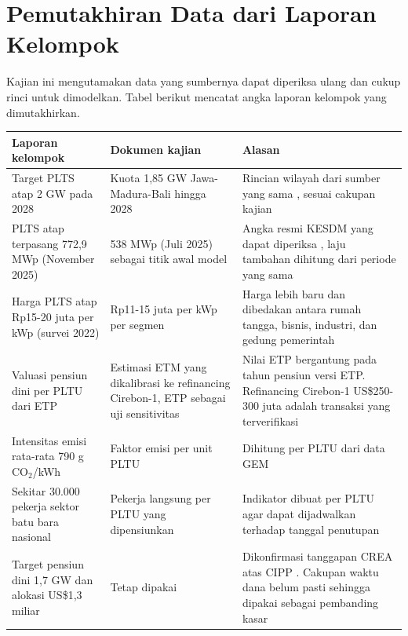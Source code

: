 \section{Pemutakhiran Data dari Laporan Kelompok}
\label{lamp:pemutakhiran}

Kajian ini mengutamakan data yang sumbernya dapat diperiksa ulang dan cukup rinci untuk dimodelkan. Tabel berikut mencatat angka laporan kelompok yang dimutakhirkan.

\begin{table}[H]
\centering
\small
\begin{tabularx}{\textwidth}{L{3.6cm} L{3.8cm} Y}
\toprule
Laporan kelompok & Dokumen kajian & Alasan \\
\midrule
Target PLTS atap 2 GW pada 2028 & Kuota 1,85 GW Jawa-Madura-Bali hingga 2028 & Rincian wilayah dari sumber yang sama \cite{B-CNBC-ROOFTOP-2028}, sesuai cakupan kajian \\
\addlinespace
PLTS atap terpasang 772,9 MWp (November 2025) & 538 MWp (Juli 2025) sebagai titik awal model & Angka resmi KESDM yang dapat diperiksa \cite{B-KONTAN-ROOFTOP-2025}, laju tambahan dihitung dari periode yang sama \\
\addlinespace
Harga PLTS atap Rp15-20 juta per kWp (survei 2022) & Rp11-15 juta per kWp per segmen & Harga lebih baru \cite{B-DETIK-HARGA-PLTS} dan dibedakan antara rumah tangga, bisnis, industri, dan gedung pemerintah \\
\addlinespace
Valuasi pensiun dini per PLTU dari ETP & Estimasi ETM yang dikalibrasi ke refinancing Cirebon-1, ETP sebagai uji sensitivitas & Nilai ETP bergantung pada tahun pensiun versi ETP. Refinancing Cirebon-1 US\$250-300 juta adalah transaksi yang terverifikasi \cite{B-REUTERS-CIREBON-2022} \\
\addlinespace
Intensitas emisi rata-rata 790 g CO$_2$/kWh & Faktor emisi per unit PLTU & Dihitung per PLTU dari data GEM \cite{D-GEM-GCPT} \\
\addlinespace
Sekitar 30.000 pekerja sektor batu bara nasional & Pekerja langsung per PLTU yang dipensiunkan & Indikator dibuat per PLTU agar dapat dijadwalkan terhadap tanggal penutupan \cite{B-ECOBUSINESS-CIREBON} \\
\addlinespace
Target pensiun dini 1,7 GW dan alokasi US\$1,3 miliar & Tetap dipakai & Dikonfirmasi tanggapan CREA atas CIPP \cite{P-CREA-CIPP-2023}. Cakupan waktu dana belum pasti sehingga dipakai sebagai pembanding kasar \\
\bottomrule
\end{tabularx}
\end{table}

